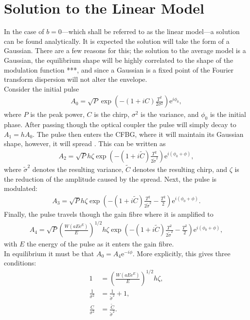 \section{Solution to the Linear Model}
\label{sec:linear}
In the case of $b = 0$---which shall be referred to as the linear model---a solution can be found analytically. It is expected the solution will take the form of a Gaussian. There are a few reasons for this; the solution to the average model is a Gaussian, the equilibrium shape will be highly correlated to the shape of the modulation function ***, and since a Gaussian is a fixed point of the Fourier transform \cite{gradshteyn} dispersion will not alter the envelope. \\

Consider the initial pulse
\begin{align*}
	A_0 = \sqrt{P} \exp \left( -(1 + iC) \frac{T^2}{2 \sigma^2} \right) \textrm{e}^{i \phi_0},
\end{align*}
where $P$ is the peak power, $C$ is the chirp, $\sigma^2$ is the variance, and $\phi_0$ is the initial phase. After passing though the optical coupler the pulse will simply decay to $A_1 = h A_0$. The pulse then enters the CFBG, where it will maintain its Gaussian shape, however, it will spread \cite{agrawal2013, ferreira, silfvast}. This can be written as
\begin{align*}
A_2 = \sqrt{P} h \zeta \exp \left( -(1 + i \widetilde{C}) \frac{T^2}{2 \widetilde{\sigma}^2} \right) \textrm{e}^{i(\phi_0 + \phi)},
\end{align*}
where $\widetilde{\sigma}^2$ denotes the resulting variance, $\widetilde{C}$ denotes the resulting chirp, and $\zeta$ is the reduction of the amplitude caused by the spread. Next, the pulse is modulated:
\begin{align*}
A_3 = \sqrt{P} h \zeta \exp \left( -(1 + i \widetilde{C}) \frac{T^2}{2 \widetilde{\sigma}^2} - \frac{T^2}{2} \right) \textrm{e}^{i(\phi_0 + \phi)}.
\end{align*}
Finally, the pulse travels though the gain fibre where it is amplified to
\begin{align*}
A_4 = \sqrt{P} \left( \frac{W(a E \textrm{e}^E)}{E} \right)^{1/2} h \zeta \exp \left( -(1 + i \widetilde{C}) \frac{T^2}{2 \widetilde{\sigma}^2} - \frac{T^2}{2} \right) \textrm{e}^{i(\phi_0 + \phi)},
\end{align*}
with $E$ the energy of the pulse as it enters the gain fibre. \\

In equilibrium it must be that $A_0 = A_4 \textrm{e}^{-i \phi}$. More explicitly, this gives three conditions:
\begin{subequations}
\begin{align}
\label{eq:energycond}
1 &= \left( \frac{W(a E \textrm{e}^E)}{E} \right)^{1/2} h \zeta, \\
\label{eq:varcond}
\frac{1}{\sigma^2} &= \frac{1}{\widetilde{\sigma}^2} + 1, \\
\label{eq:chirpcond}
\frac{C}{\sigma^2} &= \frac{\widetilde{C}}{\widetilde{\sigma}^2}.
\end{align}
\end{subequations}

